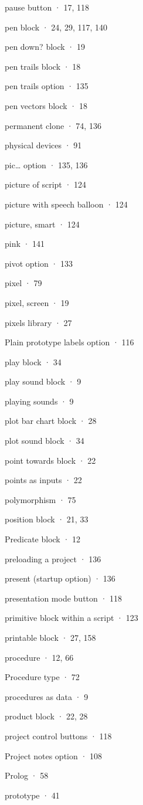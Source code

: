 pause button · 17, 118

pen block · 24, 29, 117, 140

pen down? block · 19

pen trails block · 18

pen trails option · 135

pen vectors block · 18

permanent clone · 74, 136

physical devices · 91

pic\ldots{} option · 135, 136

picture of script · 124

picture with speech balloon · 124

picture, smart · 124

pink · 141

pivot option · 133

pixel · 79

pixel, screen · 19

pixels library · 27

Plain prototype labels option · 116

play block · 34

play sound block · 9

playing sounds · 9

plot bar chart block · 28

plot sound block · 34

point towards block · 22

points as inputs · 22

polymorphism · 75

position block · 21, 33

Predicate block · 12

preloading a project · 136

present (startup option) · 136

presentation mode button · 118

primitive block within a script · 123

printable block · 27, 158

procedure · 12, 66

Procedure type · 72

procedures as data · 9

product block · 22, 28

project control buttons · 118

Project notes option · 108

Prolog · 58

prototype · 41


